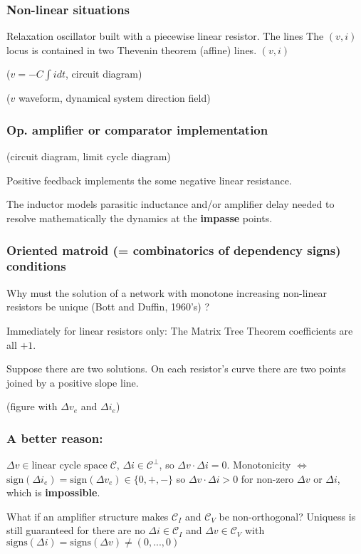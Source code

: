 \documentclass{beamer}
\begin{document}
\begin{frame}
\frametitle{Non-linear situations}
Relaxation oscillator built with a piecewise linear resistor.  The lines 
The $(v,i)$ locus is contained in two Thevenin theorem (affine) lines.
$(v,i)$ 

($v=-C\int i dt$, circuit diagram)

($v$ waveform,  dynamical system direction field) 
\end{frame}

\begin{frame}
\frametitle{Op. amplifier or comparator implementation}

(circuit diagram, limit cycle diagram)

Positive feedback implements the some negative linear resistance.

The inductor models parasitic inductance and/or amplifier delay needed to
resolve mathematically the dynamics at the \textbf{impasse} points.
\end{frame}

\begin{frame}
\frametitle{Oriented matroid (= combinatorics of dependency signs) 
conditions}

Why must the solution of a network with monotone 
increasing non-linear resistors be unique (Bott and Duffin, 1960's) ?

Immediately for linear resistors only: The Matrix Tree Theorem coefficients
are all $+1$.


Suppose there are two solutions.  On each resistor's curve there are two
points joined by a positive slope line.

(figure with $\Delta v_e$ and $\Delta i_e$)
\end{frame}

\begin{frame}
\frametitle{A better reason:}

$\Delta v \in \text{linear cycle space}\; \mathcal{C}$,
$\Delta i \in \mathcal{C}^{\perp}$, so $\Delta v \cdot \Delta i = 0$.  
Monotonicity $\Leftrightarrow$ 
$\text{sign}(\Delta i_e) = \text{sign}(\Delta v_e) \in \{0, +, -\}$ so
$\Delta v \cdot \Delta i > 0$ for non-zero $\Delta v$ or $\Delta i$, which 
is \textbf{impossible}.

What if an amplifier structure makes $\mathcal{C}_I$ and $\mathcal{C}_V$ be
non-orthogonal?  Uniquess is still guaranteed for there are no
$\Delta i\in \mathcal{C}_I$ and $\Delta v \in \mathcal{C}_V$ with
$\text{signs}(\Delta i) = \text{signs}(\Delta v) \neq (0, ..., 0)$



\end{frame}
\end{document}
